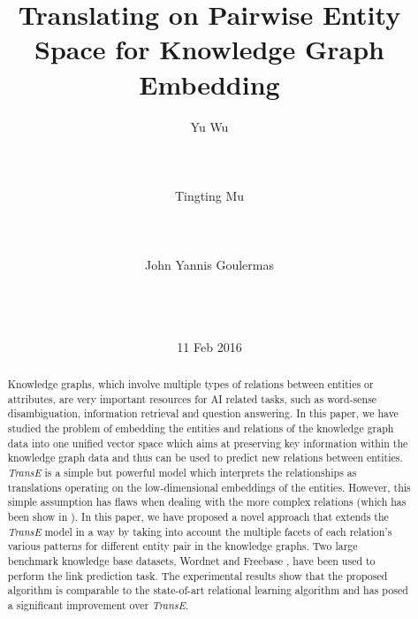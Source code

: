 \documentclass[9pt]{sig-alternate-05-2015}
\begin{document}

\title{Translating on Pairwise Entity Space for Knowledge Graph Embedding}

%
\author{
\alignauthor
Yu Wu \\
       \\
       \\
       \\
\alignauthor
Tingting Mu \\
       \\
        \\
       \\
 \alignauthor
John Yannis Goulermas \\
       \\
        \\
       \\
 }
\date{11 Feb 2016}
             
\maketitle

\begin{abstract}
Knowledge graphs, which involve multiple types of relations between entities or attributes, are very important resources for AI related tasks, such as  word-sense disambiguation, information retrieval and question answering. In this paper, we have studied the problem of embedding the entities and relations of the knowledge graph data into one unified vector space which aims at preserving key information within the knowledge graph data and thus can be used to predict new relations between  entities. \emph{TransE} \cite{bordes_translating_2013} is a simple but powerful model which interprets the relationships as translations operating on the low-dimensional embeddings of the entities. However, this simple assumption has flaws when dealing with the more complex relations (which has been show in \cite{wang_knowledge_2014}). In this paper, we have proposed a novel approach that extends the \emph{TransE} model in a way by taking into account the multiple facets of each relation's various patterns for different entity pair in the knowledge graphs. Two large benchmark knowledge base datasets, Wordnet \cite{miller_wordnet:_1995} and Freebase \cite{bollacker_freebase:_2008}, have been used to perform the link prediction task. The experimental results show that the proposed algorithm is comparable to the state-of-art relational learning algorithm and has posed a significant improvement over  \emph{TransE}.
\end{abstract}
\end{document}
